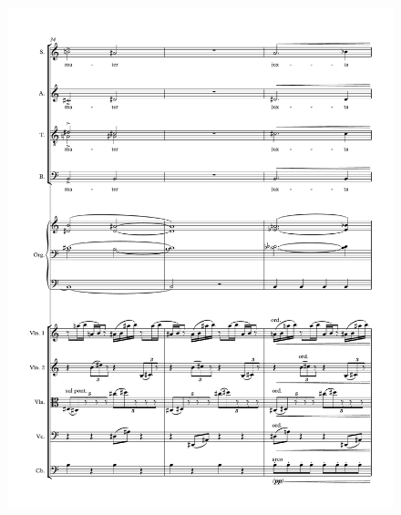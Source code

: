 \begin{figure}[htbp]
    \centering
	\includegraphics[width=6.5in]{figures/Stabat_Mater_8.pdf}
\end{figure}

